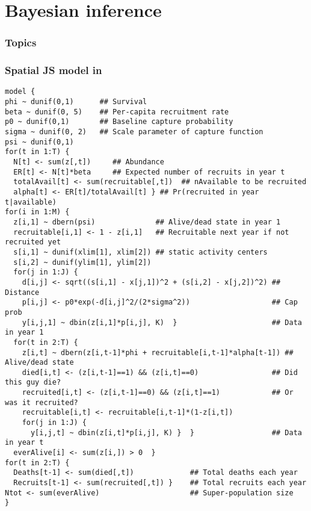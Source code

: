 \documentclass[color=usenames,dvipsnames]{beamer}\usepackage[]{graphicx}\usepackage[]{xcolor}
\makeatletter
\newenvironment{kframe}{%
 \def\at@end@of@kframe{}%
 \ifinner\ifhmode%
  \def\at@end@of@kframe{\end{minipage}}%
  \begin{minipage}{\columnwidth}%
 \fi\fi%
 \def\FrameCommand##1{\hskip\@totalleftmargin \hskip-\fboxsep
 \colorbox{shadecolor}{##1}\hskip-\fboxsep
     \hskip-\linewidth \hskip-\@totalleftmargin \hskip\columnwidth}%
 \MakeFramed {\advance\hsize-\width
   \@totalleftmargin\z@ \linewidth\hsize
   \@setminipage}}%
 {\par\unskip\endMakeFramed%
 \at@end@of@kframe}
\newenvironment{knitrout}{}{} %
\makeatother
\begin{document}
\section{Bayesian inference}




\begin{frame}[plain]
  \frametitle{Topics}
  \Large
  \tableofcontents[currentsection]
\end{frame}



\begin{frame}[fragile]
  \frametitle{Spatial JS model in \jags}
  \tiny
\begin{knitrout}\tiny
{}\color{fgcolor}\begin{kframe}
\begin{verbatim}
model {
phi ~ dunif(0,1)      ## Survival
beta ~ dunif(0, 5)    ## Per-capita recruitment rate
p0 ~ dunif(0,1)       ## Baseline capture probability
sigma ~ dunif(0, 2)   ## Scale parameter of capture function
psi ~ dunif(0,1)    
for(t in 1:T) {
  N[t] <- sum(z[,t])     ## Abundance
  ER[t] <- N[t]*beta     ## Expected number of recruits in year t
  totalAvail[t] <- sum(recruitable[,t])  ## nAvailable to be recruited
  alpha[t] <- ER[t]/totalAvail[t] } ## Pr(recruited in year t|available)
for(i in 1:M) {
  z[i,1] ~ dbern(psi)              ## Alive/dead state in year 1
  recruitable[i,1] <- 1 - z[i,1]   ## Recruitable next year if not recruited yet
  s[i,1] ~ dunif(xlim[1], xlim[2]) ## static activity centers
  s[i,2] ~ dunif(ylim[1], ylim[2])
  for(j in 1:J) {
    d[i,j] <- sqrt((s[i,1] - x[j,1])^2 + (s[i,2] - x[j,2])^2) ## Distance
    p[i,j] <- p0*exp(-d[i,j]^2/(2*sigma^2))                   ## Cap prob
    y[i,j,1] ~ dbin(z[i,1]*p[i,j], K)  }                      ## Data in year 1
  for(t in 2:T) {
    z[i,t] ~ dbern(z[i,t-1]*phi + recruitable[i,t-1]*alpha[t-1]) ## Alive/dead state 
    died[i,t] <- (z[i,t-1]==1) && (z[i,t]==0)                 ## Did this guy die?
    recruited[i,t] <- (z[i,t-1]==0) && (z[i,t]==1)            ## Or was it recruited?
    recruitable[i,t] <- recruitable[i,t-1]*(1-z[i,t])
    for(j in 1:J) {
      y[i,j,t] ~ dbin(z[i,t]*p[i,j], K) }  }                  ## Data in year t
  everAlive[i] <- sum(z[i,]) > 0  }
for(t in 2:T) {
  Deaths[t-1] <- sum(died[,t])             ## Total deaths each year
  Recruits[t-1] <- sum(recruited[,t]) }    ## Total recruits each year
Ntot <- sum(everAlive)                     ## Super-population size
}
\end{verbatim}
\end{kframe}
\end{knitrout}
\end{frame}
\end{document}
